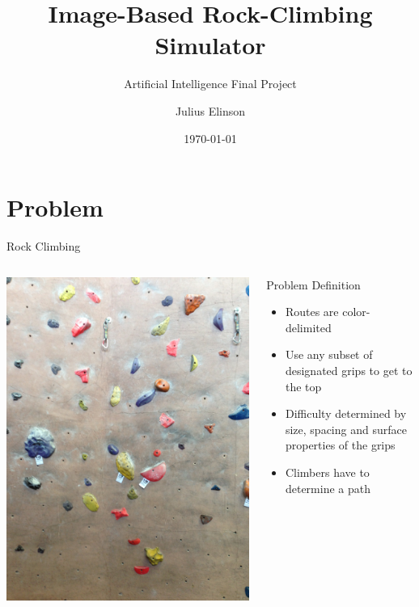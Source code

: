 \documentclass{beamer}
\author{Julius Elinson}
\title{Image-Based Rock-Climbing Simulator}
\subtitle{Artificial Intelligence Final Project}
\institute{Harvey Mudd College \\CS 151}
\date{\today}
\begin{document}
\frame{\titlepage}


\section{Problem}
\begin{frame}{Rock Climbing}
\begin{columns}

\begin{column}[T]{.5\linewidth}
\includegraphics[height=\linewidth,angle=-90]{img/test2.JPG}
\end{column}
\pause
\begin{column}[T]{.6\linewidth}
\vspace{.8cm}
Problem Definition
\begin{itemize}
 \item Routes are color-delimited
 \item Use any subset of designated grips to get to the top
 \item Difficulty determined by size, spacing and surface properties of the grips
 \item Climbers have to determine a path
\end{itemize}

\end{column}

\end{columns}
\end{frame}
\end{document}
